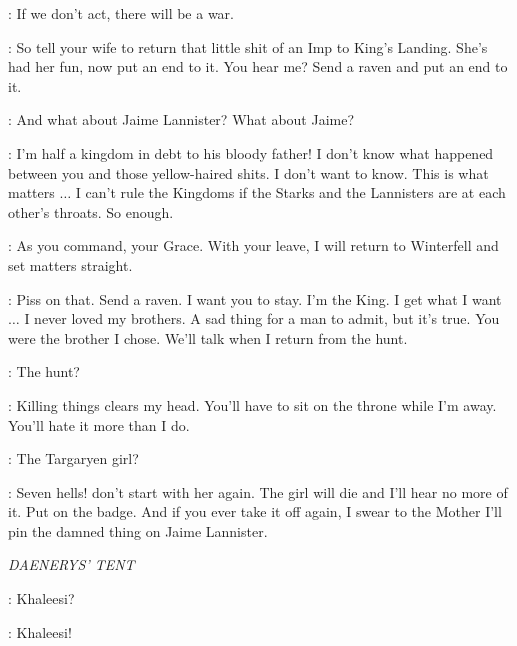 \NED: If we don't act, there will be a war. 

\ROBERT: So tell your wife to return that little shit of an Imp to King's Landing. She's had her fun, now put an end to it. You hear me? Send a raven and put an end to it. 

\NED: And what about Jaime Lannister? What about Jaime? 

\ROBERT: I'm half a kingdom in debt to his bloody father! I don't know what happened between you and those yellow-haired shits. I don't want to know. This is what matters $\ldots$ I can't rule the Kingdoms if the Starks and the Lannisters are at each other's throats. So enough. 

\NED: As you command, your Grace. With your leave, I will return to Winterfell and set matters straight. 

\ROBERT: Piss on that. Send a raven. I want you to stay. I'm the King. I get what I want $\ldots$ I never loved my brothers. A sad thing for a man to admit, but it's true. You were the brother I chose. We'll talk when I return from the hunt. 

\NED: The hunt?

\ROBERT: Killing things clears my head. You'll have to sit on the throne while I'm away. You'll hate it more than I do. 

\NED: The Targaryen girl?

\ROBERT: Seven hells! don't start with her again. The girl will die and I'll hear no more of it. Put on the badge. And if you ever take it off again, I swear to the Mother I'll pin the damned thing on Jaime Lannister. 


\scene

\textit{DAENERYS' TENT} 


\IRRI: Khaleesi? 


\IRRI: Khaleesi! 


